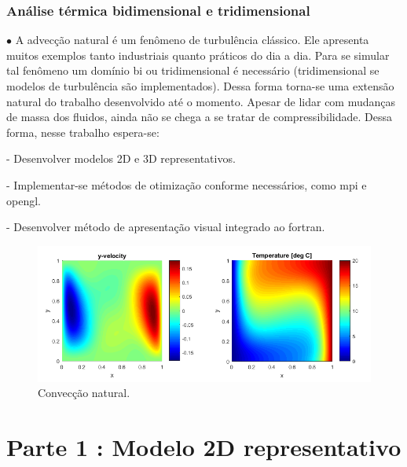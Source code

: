 \documentclass[xcolor=dvipsnames,10pt,aspectratio=169]{beamer}
\begin{document}
	
		\begin{frame}
		\frametitle{Análise térmica bidimensional e tridimensional}
			$\bullet$ A advecção natural é um fenômeno de turbulência clássico. Ele apresenta muitos exemplos tanto industriais quanto práticos do dia a dia. 
			Para se simular tal fenômeno um domínio bi ou tridimensional é necessário (tridimensional se modelos de turbulência são implementados). Dessa forma torna-se uma extensão natural do trabalho desenvolvido até o momento. Apesar de lidar com mudanças de massa dos fluidos, ainda não se chega a se tratar de compressibilidade. Dessa forma, nesse trabalho espera-se:
			
			- Desenvolver modelos 2D e 3D representativos.
			
			- Implementar-se métodos de otimização conforme necessários, como mpi e opengl.
			
			- Desenvolver método de apresentação visual integrado ao fortran. 
			
				\begin{figure}[h!]
				\centering
				\includegraphics[trim = {1.7cm 2cm 0 1cm}, clip , angle=0, scale=0.50]{NaturalConvectionFromNet}
				\caption{Convecção natural.}
				\end{figure}

		\end{frame}





	\section{Parte 1 : Modelo 2D representativo}
	
\end{document}
